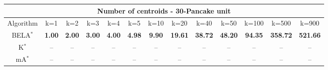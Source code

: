 \begin{tabular}{c|cccccccccccc}\toprule
\multicolumn{13}{c}{Number of centroids - 30-Pancake unit}\\ \midrule
Algorithm & k=1 & k=2 & k=3 & k=4 & k=5 & k=10 & k=20 & k=40 & k=50 & k=100 & k=500 & k=900 \\ \midrule
BELA$^*$ & \textbf{1.00} & \textbf{2.00} & \textbf{3.00} & \textbf{4.00} & \textbf{4.98} & \textbf{9.90} & \textbf{19.61} & \textbf{38.72} & \textbf{48.20} & \textbf{94.35} & \textbf{358.72} & \textbf{521.66} \\
K$^*$ & -- & -- & -- & -- & -- & -- & -- & -- & -- & -- & -- & -- \\
mA$^*$ & -- & -- & -- & -- & -- & -- & -- & -- & -- & -- & -- & -- \\ \bottomrule 
\end{tabular}
